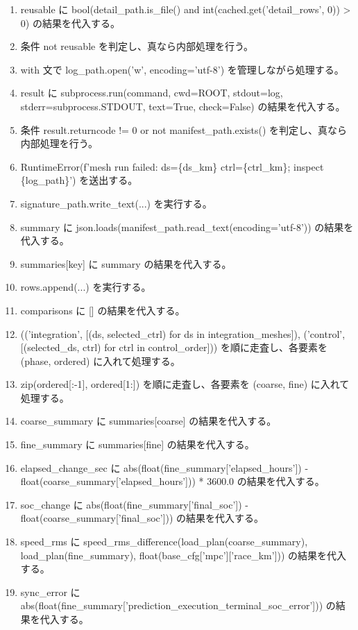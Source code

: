 \documentclass[a4paper,11pt]{article}
\begin{document}
\begin{enumerate}[leftmargin=1.8em]
\item     reusable に bool(detail\_path.is\_file() and int(cached.get('detail\_rows', 0)) > 0) の結果を代入する。
\item   条件 not reusable を判定し、真なら内部処理を行う。
\item     with 文で log\_path.open('w', encoding='utf-8') を管理しながら処理する。
\item       result に subprocess.run(command, cwd=ROOT, stdout=log, stderr=subprocess.STDOUT, text=True, check=False) の結果を代入する。
\item     条件 result.returncode != 0 or not manifest\_path.exists() を判定し、真なら内部処理を行う。
\item       RuntimeError(f'mesh run failed: ds=\{ds\_km\} ctrl=\{ctrl\_km\}; inspect \{log\_path\}') を送出する。
\item     signature\_path.write\_text(...) を実行する。
\item   summary に json.loads(manifest\_path.read\_text(encoding='utf-8')) の結果を代入する。
\item   summaries[key] に summary の結果を代入する。
\item   rows.append(...) を実行する。
\item comparisons に [] の結果を代入する。
\item (('integration', [(ds, selected\_ctrl) for ds in integration\_meshes]), ('control', [(selected\_ds, ctrl) for ctrl in control\_order])) を順に走査し、各要素を (phase, ordered) に入れて処理する。
\item   zip(ordered[:-1], ordered[1:]) を順に走査し、各要素を (coarse, fine) に入れて処理する。
\item     coarse\_summary に summaries[coarse] の結果を代入する。
\item     fine\_summary に summaries[fine] の結果を代入する。
\item     elapsed\_change\_sec に abs(float(fine\_summary['elapsed\_hours']) - float(coarse\_summary['elapsed\_hours'])) * 3600.0 の結果を代入する。
\item     soc\_change に abs(float(fine\_summary['final\_soc']) - float(coarse\_summary['final\_soc'])) の結果を代入する。
\item     speed\_rms に speed\_rms\_difference(load\_plan(coarse\_summary), load\_plan(fine\_summary), float(base\_cfg['mpc']['race\_km'])) の結果を代入する。
\item     sync\_error に abs(float(fine\_summary['prediction\_execution\_terminal\_soc\_error'])) の結果を代入する。

\end{enumerate}
\end{document}

